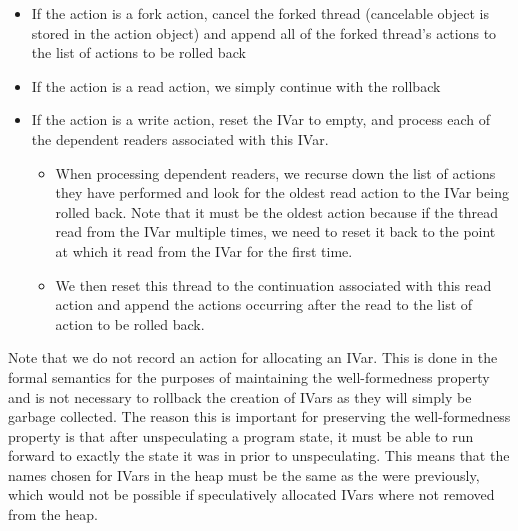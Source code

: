 \begin{itemize}
\item If the action is a fork action, cancel the forked thread (cancelable object is stored in the action object) and append all of the forked thread's actions to the list of actions to be rolled back
\item If the action is a read action, we simply continue with the rollback
\item If the action is a write action, reset the IVar to empty, and process each of the dependent readers associated with this IVar.  
\begin{itemize}
\item When processing dependent readers, we recurse down the list of actions they have performed and look for the oldest read action to the IVar being rolled back.  Note that it must be the oldest action because if the thread read from the IVar multiple times, we need to reset it back to the point at which it read from the IVar for the first time.  
\item We then reset this thread to the continuation associated with this read action and append the actions occurring after the read to the list of action to be rolled back.
\end{itemize}

\end{itemize}

Note that we do not record an action for allocating an IVar.  This is done in the formal semantics for the purposes of maintaining the well-formedness property and is not necessary to rollback the creation of IVars as they will simply be garbage collected.  The reason this is important for preserving the well-formedness property is that after unspeculating a program state, it must be able to run forward to exactly the state it was in prior to unspeculating.  This means that the names chosen for IVars in the heap must be the same as the were previously, which would not be possible if speculatively allocated IVars where not removed from the heap.  






















































